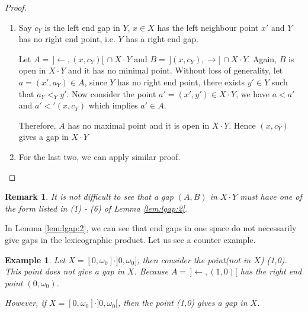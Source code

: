 \documentclass[12pt,oneside,english]{amsbook}
\numberwithin{equation}{section} %
\numberwithin{figure}{section} %
\theoremstyle{plain}
\numberwithin{section}{chapter}
\theoremstyle{plain}
\newtheorem{eg}[thm]{Example}
\newtheorem{remark}[thm]{Remark}
\begin{document}
\begin{proof}
\begin{enumerate}
    Now, we shall proof that $A$ has no maximal point.
    
    Let $a  =  (a_{X}, a_{Y})  \in  A$, then $a_{X} <_{X} x$. Since $x$ has no left neighbour point in $X$, there exists $a_{X}'  \in  A_{X}$ such that $a_{X} <_{X} a_{X}' <_{X} x$, hence for the point $a'  =  (a_{X}', a_{Y})$, we have $a < a'$ and $a' <' c = (x, c_{Y})$, which implies $a'  \in  A$. Therefore $A$ has no maximal point, so that $(x,c_{Y})$ gives a gap for $X \cdot Y$.
  \item Say $c_{Y}$ is the left end gap in $Y$, $x  \in  X$ has the left neighbour point $x'$ and $Y$ has no right end point, i.e. $Y$ has a right end gap.
    
    Let $A  = \,  ] \leftarrow, (x,c_{Y}) [ \, \cap X \cdot Y$ and $B  = \, ] (x,c_{Y}), \rightarrow [ \, \cap X \cdot Y$.
    Again, $B$ is open in $X \cdot Y$ and it has no minimal point.
    Without loss of generality, let $a  =  (x', a_{Y})  \in  A$, since $Y$ has no right end point, there exists $y'  \in  Y$ such that $a_{Y} <_{Y} y'$. Now consider the point $a'  =  (x', y')  \in  X \cdot Y$, we have $a < a'$ and $a' <' (x, c_{Y})$ which implies $a' \in  A$.

    Therefore, $A$ has no maximal point and it is open in $X \cdot Y$. Hence $(x, c_{Y})$ gives a gap in $X \cdot Y$
    \item For the last two, we can apply similar proof.
  \end{enumerate}
\end{proof}

\begin{remark}\label{remk:lem:lgap:2}
  It is not difficult to see that a gap $(A,B)$ in $X \cdot Y$ must have one of the form listed in (1) - (6) of Lemma \ref{lem:lgap:2}.
\end{remark}

In Lemma \ref{lem:lgap:2}, we can see that end gaps in one space do not necessarily give gaps in the lexicographic product. Let us see a counter example.
\begin{eg}
  Let $X  =  [ 0,\omega_0 ] \cdot ] 0,\omega_0 ]$, then consider the point(not in $X$) (1,0). This point does not give a gap in $X$. Because
  $A  = \, ] \leftarrow, (1,0) [ $ has the right end point $(0,\omega_0)$.

  However, if $X  =  [ 0,\omega_0 ] \cdot ] 0,\omega_0 [$, then the point (1,0) gives a gap in $X$.
\end{eg}
\end{document}
